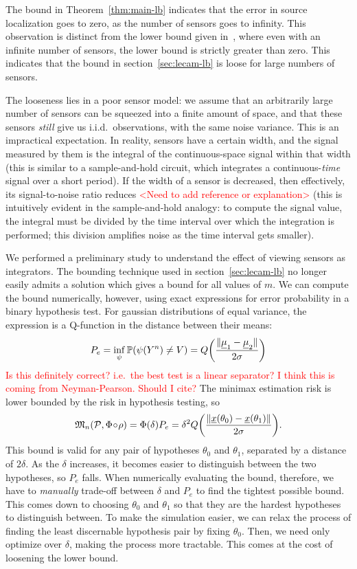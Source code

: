 \documentclass[conference]{IEEEtran}
\providecommand{\v}{}
\renewcommand{\v}[1]{\underline{#1}}
\DeclarePairedDelimiter\norm{\lVert}{\rVert}
\newcommand{\Phiorho}{\Phi\!\circ\!\rho}
\begin{document}
The bound in Theorem~\ref{thm:main-lb} indicates that the error in source
localization goes to zero, as the number of sensors goes to infinity. This
observation is distinct from the lower bound given
in~\cite{Grover2016Fundamental}, where even with an infinite number of sensors,
the lower bound is strictly greater than zero. This indicates that the bound
in section~\ref{sec:lecam-lb} is loose for large numbers of sensors.

The looseness lies in a poor sensor model: we assume that an arbitrarily large
number of sensors can be squeezed into a finite amount of space, and that these
sensors \emph{still} give us i.i.d.\ observations, with the same noise
variance. This is an impractical expectation. In reality, sensors have a
certain width, and the signal measured by them is the integral of the
continuous-space signal within that width (this is similar to a sample-and-hold
circuit, which integrates a continuous-\emph{time} signal over a short period).
If the width of a sensor is decreased, then effectively, its signal-to-noise
ratio reduces \textcolor{red}{<Need to add reference or explanation>} (this is
intuitively evident in the sample-and-hold analogy: to compute the signal
value, the integral must be divided by the time interval over which the
integration is performed; this division amplifies noise as the time interval
gets smaller).

We performed a preliminary study to understand the effect of viewing sensors
as integrators. The bounding technique used in section~\ref{sec:lecam-lb} no
longer easily admits a solution which gives a bound for all values of $m$. We
can compute the bound numerically, however, using exact expressions for error
probability in a binary hypothesis test. For gaussian distributions of equal
variance, the expression is a Q-function in the distance between their means:
\begin{equation}
	P_e = \inf_\psi \mathbb P(\psi(Y^n) \neq V) = Q\bigg(\frac{\norm{\v\mu_1 - \v\mu_2}}{2\sigma}\bigg)
\end{equation}
\textcolor{red}{Is this definitely correct? i.e.\ the best test is a linear
separator? I think this is coming from Neyman-Pearson. Should I cite?}
The minimax estimation risk is lower bounded by the risk in hypothesis testing,
so
\begin{equation}
	\mathfrak{M}_n(\mathcal{P}, \Phiorho) = \Phi(\delta) P_e = \delta^2 Q\bigg(\frac{\norm{\v x(\theta_0) - \v x(\theta_1)}}{2\sigma}\bigg).
\end{equation}
This bound is valid for any pair of hypotheses $\theta_0$ and $\theta_1$,
separated by a distance of $2\delta$. As the $\delta$ increases, it becomes
easier to distinguish between the two hypotheses, so $P_e$ falls. When
numerically evaluating the bound, therefore, we have to \emph{manually}
trade-off between $\delta$ and $P_e$ to find the tightest possible bound. This
comes down to choosing $\theta_0$ and $\theta_1$ so that they are the hardest
hypotheses to distinguish between. To make the simulation easier, we can relax
the process of finding the least discernable hypothesis pair by fixing
$\theta_0$. Then, we need only optimize over $\delta$, making the process more
tractable. This comes at the cost of loosening the lower bound.
\end{document}
